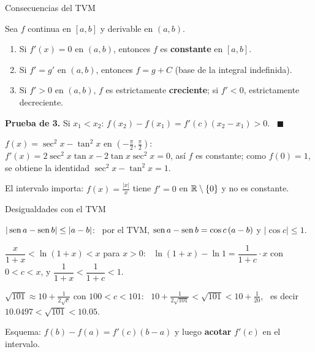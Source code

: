 \documentclass[10pt,aspectratio=169]{beamer}
\begin{document}
\begin{frame}{Consecuencias del TVM}
  \begin{teorema}
    Sea $f$ continua en $[a,b]$ y derivable en $(a,b)$.
    \begin{enumerate}
      \item Si $f'(x)=0$ en $(a,b)$, entonces $f$ es \textbf{constante} en $[a,b]$.
      \item Si $f'=g'$ en $(a,b)$, entonces $f=g+C$ (base de la integral indefinida).
      \item Si $f'>0$ en $(a,b)$, $f$ es estrictamente \textbf{creciente}; si $f'<0$, estrictamente decreciente.
    \end{enumerate}
  \end{teorema}
  \textbf{Prueba de 3.} Si $x_1<x_2$: $f(x_2)-f(x_1)=f'(c)(x_2-x_1)>0$. \ $\blacksquare$
  \begin{ejemplo}[7]
    $f(x)=\sec^2x-\tan^2x$ en $\left(-\frac\pi2,\frac\pi2\right)$: \ $f'(x)=2\sec^2x\tan x-2\tan x\sec^2x=0$, así $f$ es constante;
    como $f(0)=1$, se obtiene la identidad $\sec^2x-\tan^2x=1$.
  \end{ejemplo}
  \begin{observacion}
    El intervalo importa: $f(x)=\frac{|x|}{x}$ tiene $f'=0$ en $\mathbb{R}\setminus\{0\}$ y no es constante.
  \end{observacion}
\end{frame}

\begin{frame}{Desigualdades con el TVM}
  \begin{ejemplo}[8]
    $|\operatorname{sen} a-\operatorname{sen} b|\le|a-b|$: \ por el TVM, $\operatorname{sen} a-\operatorname{sen} b=\cos c\,(a-b)$ y $|\cos c|\le1$.
  \end{ejemplo}
  \begin{ejemplo}[9]
    $\dfrac{x}{1+x}<\ln(1+x)<x$ para $x>0$: \ $\ln(1+x)-\ln1=\dfrac{1}{1+c}\cdot x$ con $0<c<x$, y $\dfrac1{1+x}<\dfrac1{1+c}<1$.
  \end{ejemplo}
  \begin{ejemplo}
    $\sqrt{101}\approx10+\frac{1}{2\sqrt c}$ con $100<c<101$: \ $10+\frac{1}{2\sqrt{101}}<\sqrt{101}<10+\frac1{20}$, \
    es decir $10.0497<\sqrt{101}<10.05$.
  \end{ejemplo}
  \begin{idea}
    Esquema: $f(b)-f(a)=f'(c)(b-a)$ y luego \textbf{acotar} $f'(c)$ en el intervalo.
  \end{idea}
\end{frame}
\end{document}

